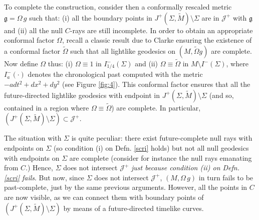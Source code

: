 To complete the construction, consider then a conformally rescaled metric $\mathfrak{g}=\Omega\, g$ such that: (i) all the boundary points in $J^+(\Sigma,\tilde{M})\setminus\Sigma$ are in $\mathcal{J}^{+}$ with $\mathfrak{g}$ and (ii) all the null $C$-rays are still incomplete. In order to obtain an appropriate conformal factor $\Omega$, recall a classic result due to Clarke \cite{Clarkegeodesiccompletenesscausal1971} ensuring the existence of a conformal factor $\tilde{\Omega}$ such that all lightlike geodesics on $(M,\tilde{\Omega} g)$ are complete. Now define $\Omega$ thus: (i) $\Omega\equiv 1$ in $I^{-}_{1/4}(\Sigma)$ and (ii) $\Omega\equiv \tilde{\Omega}$ in $M\setminus I^{-}(\Sigma)$, where $I^{-}_{a}(\cdot)$ denotes the chronological past computed with the metric $-adt^2+dx^2+dy^{2}$ (see Figure \ref{fig:4}).
This conformal factor ensures that all the future-directed lightlike geodesics with endpoint in $J^+(\Sigma,\tilde{M})\setminus \Sigma$ (and so, contained in a region where $\Omega\equiv \tilde{\Omega}$) are complete. In particular, $\left(J^+(\Sigma,\tilde{M})\setminus \Sigma\right)\subset \mathcal{J}^+$.

The situation with $\Sigma$ is quite peculiar: there exist future-complete null rays with endpoints on $\Sigma$ (so condition (i) on Defn. \ref{scri} holds) but not all null geodesics with endpoints on $\Sigma$ are complete (consider for instance the null rays emanating from $C$.) Hence, $\Sigma$ does not intersect $\mathcal{J}^+$ \textit{just because condition (ii) on Defn. \ref{scri} fails}. But now, since $\Sigma$ does not intersect $\mathcal{J}^+$, $(M,\Omega\,g)$ in turn fails to be past-complete, just by the same previous arguments. However, all the points in $C$ are now visible, as we can connect them with boundary points of $\left(J^+(\Sigma,\tilde{M})\setminus \Sigma\right)$ by means of a future-directed timelike curves.


